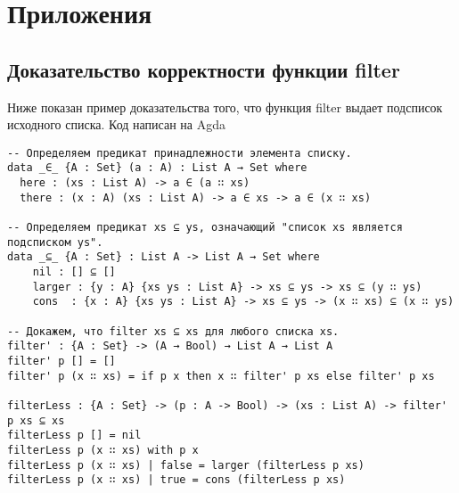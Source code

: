 \appendix
\section*{Приложения}
\renewcommand{\thesubsection}{\Alph{subsection}}

\subsection{Доказательство корректности функции filter}\label{sort_proof}

Ниже показан пример доказательства того, что функция filter выдает подсписок исходного списка.
Код написан на Agda\cite{agda}

\begin{lstlisting}
-- Определяем предикат принадлежности элемента списку.
data _∈_ {A : Set} (a : A) : List A → Set where
  here : (xs : List A) -> a ∈ (a ∷ xs)
  there : (x : A) (xs : List A) -> a ∈ xs -> a ∈ (x ∷ xs)

-- Определяем предикат xs ⊆ ys, означающий "список xs является подсписком ys".
data _⊆_ {A : Set} : List A -> List A → Set where
    nil : [] ⊆ []
    larger : {y : A} {xs ys : List A} -> xs ⊆ ys -> xs ⊆ (y ∷ ys)
    cons  : {x : A} {xs ys : List A} -> xs ⊆ ys -> (x ∷ xs) ⊆ (x ∷ ys)

-- Докажем, что filter xs ⊆ xs для любого списка xs.
filter' : {A : Set} -> (A → Bool) → List A → List A
filter' p [] = []
filter' p (x ∷ xs) = if p x then x ∷ filter' p xs else filter' p xs

filterLess : {A : Set} -> (p : A -> Bool) -> (xs : List A) -> filter' p xs ⊆ xs
filterLess p [] = nil
filterLess p (x ∷ xs) with p x
filterLess p (x ∷ xs) | false = larger (filterLess p xs)
filterLess p (x ∷ xs) | true = cons (filterLess p xs)

\end{lstlisting}

